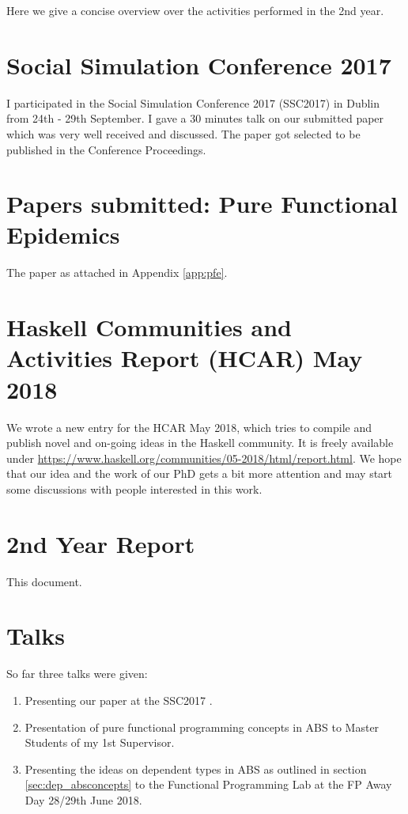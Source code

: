 Here we give a concise overview over the activities performed in the 2nd year.

\section{Social Simulation Conference 2017}
I participated in the Social Simulation Conference 2017 (SSC2017) in Dublin from 24th - 29th September. I gave a 30 minutes talk on our submitted paper \cite{thaler_art_2017} which was very well received and discussed. The paper got selected to be published in the Conference Proceedings.

\section{Papers submitted: Pure Functional Epidemics}
The paper as attached in Appendix \ref{app:pfe}.

\section{Haskell Communities and Activities Report (HCAR) May 2018}
We wrote a new entry for the HCAR May 2018, which tries to compile and publish novel and on-going ideas in the Haskell community. It is freely available under \url{https://www.haskell.org/communities/05-2018/html/report.html}. We hope that our idea and the work of our PhD gets a bit more attention and may start some discussions with people interested in this work.

\section{2nd Year Report}
This document.

\section{Talks}
So far three talks were given:

\begin{enumerate}
	\item Presenting our paper \cite{thaler_art_2017} at the SSC2017 .
	\item Presentation of pure functional programming concepts in ABS to Master Students of my 1st Supervisor.
	\item Presenting the ideas on dependent types in ABS as outlined in section \ref{sec:dep_absconcepts} to the Functional Programming Lab at the FP Away Day 28/29th June 2018.
\end{enumerate} 